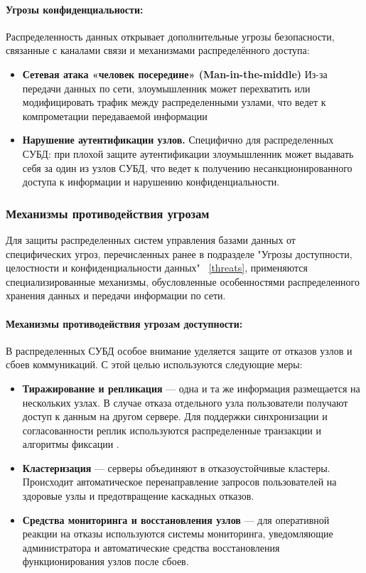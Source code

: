 \paragraph{Угрозы конфиденциальности:}

Распределенность данных открывает дополнительные угрозы безопасности, связанные с каналами связи и механизмами распределённого доступа:

\begin{itemize} 
    \item \textbf{Сетевая атака «человек посередине» (Man-in-the-middle)} Из-за передачи данных по сети, злоумышленник может перехватить или модифицировать трафик между распределенными узлами, что ведет к компрометации передаваемой информации  
    \item \textbf{Нарушение аутентификации узлов.} Специфично для распределенных СУБД: при плохой защите аутентификации злоумышленник может выдавать себя за один из узлов СУБД, что ведет к получению несанкционированного доступа к информации и нарушению конфиденциальности. 
\end{itemize}

\subsubsection{Механизмы противодействия угрозам}

Для защиты распределенных систем управления базами данных от специфических угроз, перечисленных ранее в подразделе "Угрозы доступности, целостности и конфиденциальности данных" ~\ref{threats}, применяются специализированные механизмы, обусловленные особенностями распределенного хранения данных и передачи информации по сети.

\paragraph{Механизмы противодействия угрозам доступности:}

В распределенных СУБД особое внимание уделяется защите от отказов узлов и сбоев коммуникаций. С этой целью используются следующие меры:

\begin{itemize} 
    \item \textbf{Тиражирование и репликация} — одна и та же информация размещается на нескольких узлах. В случае отказа отдельного узла пользователи получают доступ к данным на другом сервере. Для поддержки синхронизации и согласованности реплик используются распределенные транзакции и алгоритмы фиксации \autocite[гл. Непротиворечивость и репликация]{Tanenbaum}.
    \item \textbf{Кластеризация} — серверы объединяют в отказоустойчивые кластеры. Происходит автоматическое перенаправление запросов пользователей на здоровые узлы и предотвращение каскадных отказов.
    \item \textbf{Средства мониторинга и восстановления узлов} — для оперативной реакции на отказы используются системы мониторинга, уведомляющие администратора и автоматические средства восстановления функционирования узлов после сбоев.
\end{itemize}

